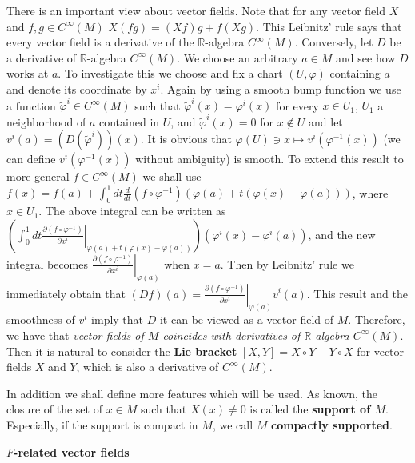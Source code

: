 \documentclass{article}
\newcommand{\ReR}{\mathbb{R}}
\newcommand{\parderbar}[3]{\left. \frac{\partial #1}{\partial #2} \right|_{#3}}
\newcommand{\ordder}[2]{\frac{d #1}{d #2}}
\begin{document}
There is an important view about vector fields.
Note that for any vector field $X$ and $f, g \in C^\infty(M)$ $X(fg) = (Xf)g + f(Xg)$.
This Leibnitz' rule says that every vector field is a derivative of the $\ReR$-algebra $C^\infty(M)$.
Conversely, let $D$ be a derivative of $\ReR$-algebra $C^\infty(M)$.
We choose an arbitrary $a \in M$ and see how $D$ works at $a$.
To investigate this we choose and fix a chart $(U, \varphi)$ containing $a$ and denote its coordinate by $x^i$.
Again by using a smooth bump function we use a function $\tilde{\varphi}^i \in C^\infty(M)$ such that $\tilde{\varphi}^i(x) = \varphi^i(x)$ for every $x \in U_1$, $U_1$ a neighborhood of $a$ contained in $U$, and $\tilde{\varphi}^i(x) = 0$ for $x \notin U$ and let $v^i(a) = (D(\tilde{\varphi}^i))(x)$.
It is obvious that $\varphi(U) \ni x \mapsto v^i(\varphi^{-1}(x))$ (we can define $v^i(\varphi^{-1}(x))$ without ambiguity) is smooth.
To extend this result to more general $f \in C^\infty(M)$ we shall use $f(x) = f(a) + \int_0^1 dt \ordder{}{t} (f \circ \varphi^{-1})(\varphi(a) + t(\varphi(x) - \varphi(a)))$, where $x \in U_1$.
The above integral can be written as $\left( \int_0^1 dt \parderbar{(f \circ \varphi^{-1})}{x^i}{\varphi(a) + t(\varphi(x) - \varphi(a))} \right) (\varphi^i(x) - \varphi^i(a))$, and the new integral becomes $\parderbar{(f \circ \varphi^{-1})}{x^i}{\varphi(a)}$ when $x = a$.
Then by Leibnitz' rule we immediately obtain that $(Df)(a) = \parderbar{(f \circ \varphi^{-1})}{x^i}{\varphi(a)} v^i(a)$.
This result and the smoothness of $v^i$ imply that $D$ it can be viewed as a vector field of $M$.
Therefore, we have that \textit{vector fields of $M$ coincides with derivatives of $\ReR$-algebra $C^\infty(M)$}.
Then it is natural to consider the \textbf{Lie bracket} $[X, Y] = X \circ Y - Y \circ X$ for vector fields $X$ and $Y$, which is also a derivative of $C^\infty(M)$.

In addition we shall define more features which will be used.
As known, the closure of the set of $x \in M$ such that $X(x) \ne 0$ is called the \textbf{support of $M$}.
Especially, if the support is compact in $M$, we call $M$ \textbf{compactly supported}.

\newpage

\textbf{$F$-related vector fields}
\end{document}
